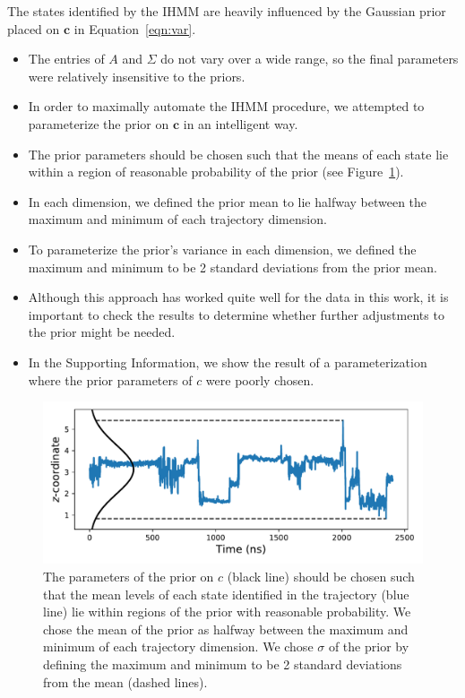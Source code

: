 \documentclass{article}
\begin{document}
  The states identified by the IHMM are heavily influenced by the Gaussian prior
  placed on $\mathbf{c}$ in Equation~\ref{eqn:var}.
  \begin{itemize}
    \item The entries of $A$ and $\Sigma$ do not vary over a wide range, so
    the final parameters were relatively insensitive to the priors.
    \item In order to maximally automate the IHMM procedure, we attempted to
    parameterize the prior on $\mathbf{c}$ in an intelligent way.
    \item The prior parameters should be chosen such that the means of 
    each state lie within a region of reasonable probability of the prior (see
    Figure~\ref{fig:prior_guesses}).
    \item In each dimension, we defined the prior mean to lie halfway between the 
    maximum and minimum of each trajectory dimension. 
    \item To parameterize the prior's variance in each dimension, we defined the
    maximum and minimum to be 2 standard deviations from the prior mean.
    \item Although this approach has worked quite well for the data in this work,
    it is important to check the results to determine whether further adjustments
    to the prior might be needed.
    \item In the Supporting Information, we show the result of a parameterization
    where the prior parameters of $c$ were poorly chosen. %
  \end{itemize}
  
  \begin{figure}
  \centering
  \includegraphics[width=\textwidth]{prior_guesses.pdf}
  \caption{The parameters of the prior on $c$ (black line) should be chosen such
  that the mean levels of each state identified in the trajectory (blue line) lie within
  regions of the prior with reasonable probability. We chose the mean of the prior 
  as halfway between the maximum and minimum of each trajectory dimension. We chose 
  $\sigma$ of the prior by defining the maximum and minimum to be 2 standard deviations
  from the mean (dashed lines).}\label{fig:prior_guesses}
  \end{figure}
  
\end{document}
